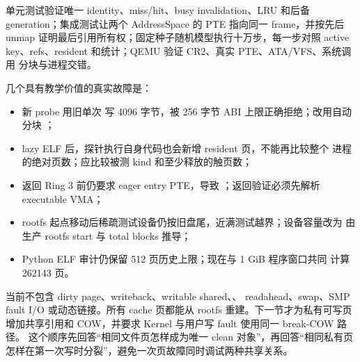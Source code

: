 单元测试验证唯一 identity、miss/hit、busy invalidation、LRU 和后备
generation；集成测试让两个 AddressSpace 的 PTE 指向同一 frame，并按先后
unmap 证明最后引用所有权；固定种子随机模型执行十万步，每一步对照 active
key、refs、resident 和统计；QEMU 验证 CR2、真实 PTE、ATA/VFS、系统调用
分块与进程交错。

几个具有教学价值的真实故障是：

\begin{itemize}
  \item 新 probe 用旧单次  写 4096 字节，被 256 字节 ABI
        上限正确拒绝；改用自动分块 ；
  \item lazy ELF 后，探针执行自身代码也会新增 resident 页，不能再比较整个
       进程的绝对页数；应比较被测 kind 和至少释放的触页数；
  \item 返回 Ring 3 前仍要求 eager entry PTE，导致
        ；返回验证必须先解析 executable VMA；
  \item rootfs 起点移动后稀疏测试设备仍按旧盘尾，近满测试越界；设备容量改为
       由生产 rootfs start 与 total blocks 推导；
  \item Python ELF 审计仍保留 512 页历史上限；现在与 1 GiB 程序窗口共同
       计算 262143 页。
\end{itemize}

当前不包含 dirty page、writeback、writable shared、、
readahead、swap、SMP fault I/O 或动态链接。所有 cache 页都能从 rootfs
重建。下一节才为私有可写页增加共享引用和 COW，并要求 Kernel
 与用户写 fault 使用同一 break-COW 路径。
这个顺序先回答“相同文件页怎样成为唯一 clean 对象”，再回答“相同私有页
怎样在第一次写时分裂”，避免一次页故障同时调试两种共享关系。
